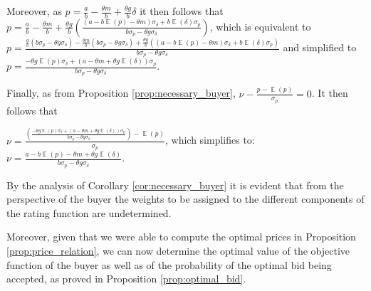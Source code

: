 \documentclass[informs]{informs3}
\begin{document}
Moreover, as $p =\frac{a}{b}-\frac{\theta m}{b}+\frac{\theta g }{b}\delta$ it then follows that $p =\frac{a}{b}-\frac{\theta m}{b}+\frac{\theta g }{b}\left(   \frac{\left(a-b\mathop{\mathbb{E}}\left(p\right) -\theta m\right)\sigma_{\delta}+b\mathop{\mathbb{E}}\left(\delta\right)\sigma_{p}}{b\sigma_{p}-\theta g\sigma_{\delta}}  \right) $, which is equivalent to
$p =\frac{\frac{a}{b}\left(b\sigma_{p}-\theta g\sigma_{\delta}\right)-\frac{\theta m}{b}\left(b\sigma_{p}-\theta g\sigma_{\delta}\right)+\frac{\theta g }{b}\left(   \left(a-b\mathop{\mathbb{E}}\left(p\right) -\theta m\right)\sigma_{\delta}+b\mathop{\mathbb{E}}\left(\delta\right)\sigma_{p}\right)}{b\sigma_{p}-\theta g\sigma_{\delta}}$ and simplified to
$p =\frac{-\theta g \mathop{\mathbb{E}}\left(p\right)\sigma_{\delta}+\left(a-\theta m+\theta g \mathop{\mathbb{E}}\left(\delta\right)\right)\sigma_{p}}{b\sigma_{p}-\theta g\sigma_{\delta}}$.

Finally, as from Proposition \ref{prop:necessary_buyer},
$\nu - \frac{p-\mathop{\mathbb{E}}\left(p\right)}{\sigma_{p}}=0$. It then follows that

$\nu = \frac{\left(\frac{-\theta g \mathop{\mathbb{E}}\left(p\right)\sigma_{\delta}+\left(a-\theta m+\theta g \mathop{\mathbb{E}}\left(\delta\right)\right)\sigma_{p}}{b\sigma_{p}-\theta g\sigma_{\delta}} \right)-\mathop{\mathbb{E}}\left(p\right)}{\sigma_{p}}$, which simplifies to:
$\nu =\frac{a-b \mathop{\mathbb{E}}\left(p\right)-\theta m+\theta g \mathop{\mathbb{E}}\left(\delta\right)}{b\sigma_{p}-\theta g\sigma_{\delta}}$.
\Halmos
\endproof 

By the analysis of Corollary \ref{cor:necessary_buyer} it is evident that from the perspective of the buyer the weights to be assigned to the different components of the rating function are undetermined. 

Moreover, given that we were able to compute the optimal prices in Proposition  \ref{prop:price_relation}, we can now determine the optimal value of the objective function of the buyer as well as of the probability of the optimal bid being accepted, as proved in Proposition \ref{prop:optimal_bid}.
\end{document}

